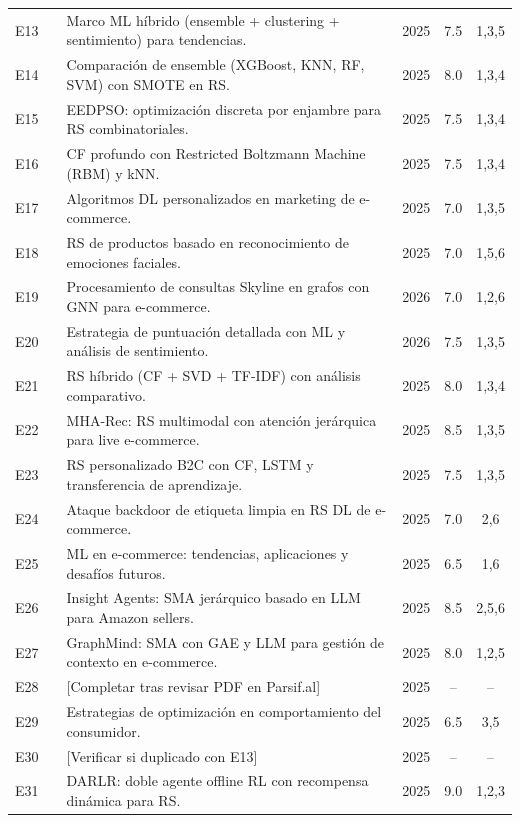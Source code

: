 \documentclass[12pt, a4paper]{article}
\begin{document}
\begin{longtable}{clp{5.2cm}ccc}
E13 & \cite{Sivakumar2025}  &
  Marco ML h\'ibrido (ensemble + clustering + sentimiento) para tendencias.
  & 2025 & 7.5 & 1,3,5 \\
E14 & \cite{Dinata2025}     &
  Comparaci\'on de ensemble (XGBoost, KNN, RF, SVM) con SMOTE en RS.
  & 2025 & 8.0 & 1,3,4 \\
E15 & \cite{Lin2025}        &
  EEDPSO: optimizaci\'on discreta por enjambre para RS combinatoriales.
  & 2025 & 7.5 & 1,3,4 \\
E16 & \cite{Alam2025}       &
  CF profundo con Restricted Boltzmann Machine (RBM) y kNN.
  & 2025 & 7.5 & 1,3,4 \\
E17 & \cite{LiYuetong2025}  &
  Algoritmos DL personalizados en marketing de e-commerce.
  & 2025 & 7.0 & 1,3,5 \\
E18 & \cite{Dhoria2025}     &
  RS de productos basado en reconocimiento de emociones faciales.
  & 2025 & 7.0 & 1,5,6 \\
E19 & \cite{Adzman2026}     &
  Procesamiento de consultas Skyline en grafos con GNN para e-commerce.
  & 2026 & 7.0 & 1,2,6 \\
E20 & \cite{Najib2026}      &
  Estrategia de puntuaci\'on detallada con ML y an\'alisis de sentimiento.
  & 2026 & 7.5 & 1,3,5 \\
E21 & \cite{Girish2025}     &
  RS h\'ibrido (CF + SVD + TF-IDF) con an\'alisis comparativo.
  & 2025 & 8.0 & 1,3,4 \\
E22 & \cite{Ding2025}       &
  MHA-Rec: RS multimodal con atenci\'on jer\'arquica para live e-commerce.
  & 2025 & 8.5 & 1,3,5 \\
E23 & \cite{Lu2025}         &
  RS personalizado B2C con CF, LSTM y transferencia de aprendizaje.
  & 2025 & 7.5 & 1,3,5 \\
E24 & \cite{Liu2025backdoor}&
  Ataque backdoor de etiqueta limpia en RS DL de e-commerce.
  & 2025 & 7.0 & 2,6 \\
E25 & \cite{MLEcommerce2025}&
  ML en e-commerce: tendencias, aplicaciones y desaf\'ios futuros.
  & 2025 & 6.5 & 1,6 \\
E26 & \cite{Bai2025}        &
  Insight Agents: SMA jer\'arquico basado en LLM para Amazon sellers.
  & 2025 & 8.5 & 2,5,6 \\
E27 & \cite{Ho2025GraphMind}&
  GraphMind: SMA con GAE y LLM para gesti\'on de contexto en e-commerce.
  & 2025 & 8.0 & 1,2,5 \\
E28 & \cite{ACM3705328}     &
  [Completar tras revisar PDF en Parsif.al]
  & 2025 & -- & -- \\
E29 & \cite{OptimizationConsumer2025} &
  Estrategias de optimizaci\'on en comportamiento del consumidor.
  & 2025 & 6.5 & 3,5 \\
E30 & \cite{Sivakumar2025}  &
  [Verificar si duplicado con E13]
  & 2025 & -- & -- \\
E31 & \cite{Zhang2025DARLR} &
  DARLR: doble agente offline RL con recompensa din\'amica para RS.
  & 2025 & 9.0 & 1,2,3 \\
\end{longtable}
\end{document}
